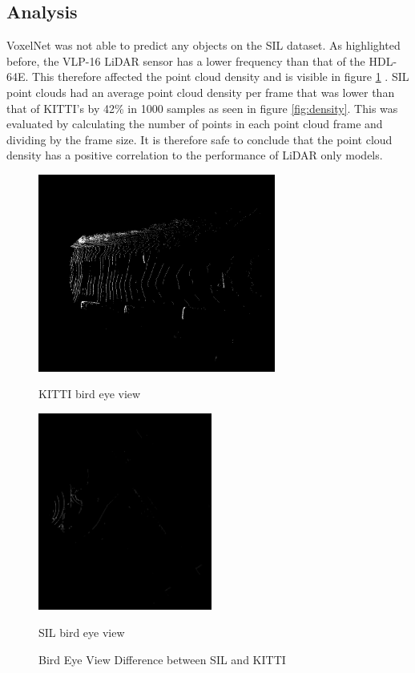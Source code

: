 \subsection*{Analysis}
VoxelNet was not able to predict any objects on the SIL dataset. As highlighted before, the VLP-16 LiDAR sensor has a lower frequency than that of the HDL-64E. This therefore affected the point cloud density and is visible in figure \ref{fig:difference} . SIL point clouds had an average point cloud density per frame that was lower than that of KITTI's by 42\%  in 1000 samples as seen in figure \ref{fig:density}. This was evaluated by calculating the number of points in each point cloud frame and dividing by the frame size. It is therefore safe to conclude that the point cloud density has a positive correlation to the performance of LiDAR only models. 


\begin{figure}[H] %
	\centering
	\begin{minipage}[b]{0.49\textwidth}
		\includegraphics[width=\textwidth,height=6.5cm]{images/kitti_bv}
		\caption*{KITTI bird eye view}
	\end{minipage}
	\begin{minipage}[b]{0.49\textwidth}
		\includegraphics[width=\textwidth,height=6.5cm]{images/sil_bv}
		\caption*{SIL bird eye view}
	\end{minipage}
	\caption{Bird Eye View Difference between SIL and KITTI}
	\label{fig:difference}
\end{figure}

